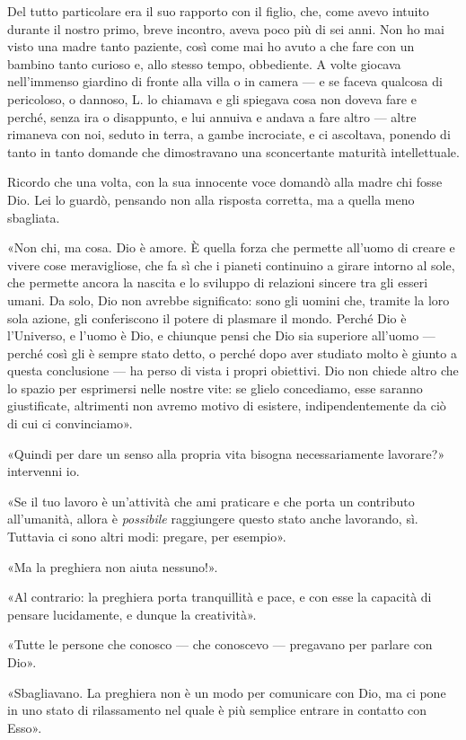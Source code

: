 Del tutto particolare era il suo rapporto con il figlio, che, come avevo intuito durante il nostro
primo, breve incontro, aveva poco più di sei anni. Non ho mai visto una madre tanto paziente, così
come mai ho avuto a che fare con un bambino tanto curioso e, allo stesso tempo, obbediente. A volte
giocava nell'immenso giardino di fronte alla villa o in camera --- e se faceva qualcosa di
pericoloso, o dannoso, L. lo chiamava e gli spiegava cosa non doveva fare e perché, senza ira o
disappunto, e lui annuiva e andava a fare altro --- altre rimaneva con noi, seduto in terra, a gambe
incrociate, e ci ascoltava, ponendo di tanto in tanto domande che dimostravano una sconcertante
maturità intellettuale.

Ricordo che una volta, con la sua innocente voce domandò alla madre chi fosse Dio. Lei lo guardò,
pensando non alla risposta corretta, ma a quella meno sbagliata.

«Non chi, ma cosa. Dio è amore. È quella forza che permette all'uomo di creare e vivere cose
meravigliose, che fa sì che i pianeti continuino a girare intorno al sole, che permette ancora la
nascita e lo sviluppo di relazioni sincere tra gli esseri umani. Da solo, Dio non avrebbe
significato: sono gli uomini che, tramite la loro sola azione, gli conferiscono il potere di
plasmare il mondo. Perché Dio è l'Universo, e l'uomo è Dio, e chiunque pensi che Dio sia superiore
all'uomo --- perché così gli è sempre stato detto, o perché dopo aver studiato molto è giunto a
questa conclusione --- ha perso di vista i propri obiettivi. Dio non chiede altro che lo spazio per
esprimersi nelle nostre vite: se glielo concediamo, esse saranno giustificate, altrimenti non avremo
motivo di esistere, indipendentemente da ciò di cui ci convinciamo».

«Quindi per dare un senso alla propria vita bisogna necessariamente lavorare?» intervenni io.

«Se il tuo lavoro è un'attività che ami praticare e che porta un contributo all'umanità, allora è
\emph{possibile} raggiungere questo stato anche lavorando, sì. Tuttavia ci sono altri modi: pregare,
per esempio».

«Ma la preghiera non aiuta nessuno!».

«Al contrario: la preghiera porta tranquillità e pace, e con esse la capacità di pensare
lucidamente, e dunque la creatività».

«Tutte le persone che conosco --- che conoscevo --- pregavano per parlare con Dio».

«Sbagliavano. La preghiera non è un modo per comunicare con Dio, ma ci pone in uno stato di
rilassamento nel quale è più semplice entrare in contatto con Esso».

